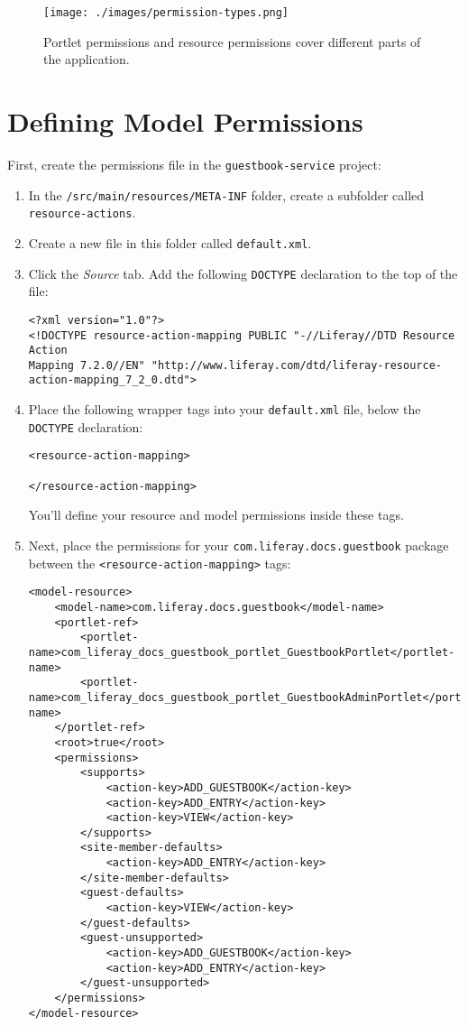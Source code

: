 \begin{figure}
\centering
\texttt{[image: ./images/permission-types.png]}
\caption{Portlet permissions and resource permissions cover different
parts of the application.}
\end{figure}

\section{Defining Model Permissions}\label{defining-model-permissions}

First, create the permissions file in the \texttt{guestbook-service}
project:

\begin{enumerate}
\def\labelenumi{\arabic{enumi}.}
\item
  In the \texttt{/src/main/resources/META-INF} folder, create a
  subfolder called \texttt{resource-actions}.
\item
  Create a new file in this folder called \texttt{default.xml}.
\item
  Click the \emph{Source} tab. Add the following \texttt{DOCTYPE}
  declaration to the top of the file:

\begin{verbatim}
<?xml version="1.0"?>
<!DOCTYPE resource-action-mapping PUBLIC "-//Liferay//DTD Resource Action  
Mapping 7.2.0//EN" "http://www.liferay.com/dtd/liferay-resource-action-mapping_7_2_0.dtd">
\end{verbatim}
\item
  Place the following wrapper tags into your \texttt{default.xml} file,
  below the \texttt{DOCTYPE} declaration:

\begin{verbatim}
<resource-action-mapping>

</resource-action-mapping>
\end{verbatim}

  You'll define your resource and model permissions inside these tags.
\item
  Next, place the permissions for your
  \texttt{com.liferay.docs.guestbook} package between the
  \texttt{\textless{}resource-action-mapping\textgreater{}} tags:

\begin{verbatim}
<model-resource>
    <model-name>com.liferay.docs.guestbook</model-name>
    <portlet-ref>
        <portlet-name>com_liferay_docs_guestbook_portlet_GuestbookPortlet</portlet-name>
        <portlet-name>com_liferay_docs_guestbook_portlet_GuestbookAdminPortlet</portlet-name>
    </portlet-ref>
    <root>true</root>
    <permissions>
        <supports>
            <action-key>ADD_GUESTBOOK</action-key>
            <action-key>ADD_ENTRY</action-key>
            <action-key>VIEW</action-key>
        </supports>
        <site-member-defaults>
            <action-key>ADD_ENTRY</action-key>
        </site-member-defaults>
        <guest-defaults>
            <action-key>VIEW</action-key>
        </guest-defaults>
        <guest-unsupported>
            <action-key>ADD_GUESTBOOK</action-key>
            <action-key>ADD_ENTRY</action-key>
        </guest-unsupported>
    </permissions>
</model-resource>
\end{verbatim}


\end{enumerate}
